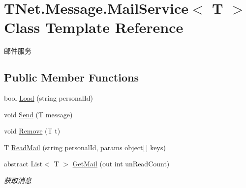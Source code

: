 \hypertarget{class_t_net_1_1_message_1_1_mail_service}{}\section{T\+Net.\+Message.\+Mail\+Service$<$ T $>$ Class Template Reference}
\label{class_t_net_1_1_message_1_1_mail_service}


邮件服务  


\subsection*{Public Member Functions}
\begin{DoxyCompactItemize}
\item 
bool \mbox{\hyperlink{class_t_net_1_1_message_1_1_mail_service_ae69234029e3cf358aa911f7af6741119}{Load}} (string personal\+Id)
\item 
void \mbox{\hyperlink{class_t_net_1_1_message_1_1_mail_service_a38058f57f66bb97aa3824cedf4044690}{Send}} (T message)
\item 
void \mbox{\hyperlink{class_t_net_1_1_message_1_1_mail_service_a53266fa807f2906979e686dafd43eb38}{Remove}} (T t)
\item 
T \mbox{\hyperlink{class_t_net_1_1_message_1_1_mail_service_a13bc939f5a0541bddf47ac47ae6a6bc4}{Read\+Mail}} (string personal\+Id, params object\mbox{[}$\,$\mbox{]} keys)
\item 
abstract List$<$ T $>$ \mbox{\hyperlink{class_t_net_1_1_message_1_1_mail_service_ac933afe67fdb7c55c59b1a2a07e76866}{Get\+Mail}} (out int un\+Read\+Count)
\begin{DoxyCompactList}\small\item\em 获取消息 \end{DoxyCompactList}\end{DoxyCompactItemize}
